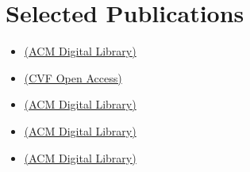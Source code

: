 \documentclass[11pt,a4paper,unicode]{moderncv}
\begin{document}
\section{Selected Publications}
\begin{itemize}[leftmargin=1cm,itemsep=0.3ex]
    \small
    \item {}
        \href{https://dl.acm.org/doi/10.1145/3528223.3530120}{(ACM Digital Library)}
    \item {}
    \href{https://openaccess.thecvf.com/content/CVPR2022/papers/Palmer_DeepCurrents_Learning_Implicit_Representations_of_Shapes_With_Boundaries_CVPR_2022_paper.pdf}{(CVF Open Access)}
    \item {}
        \href{https://dl.acm.org/doi/10.1145/3450626.3459781}{(ACM Digital Library)}
    \item {}
    \href{https://dl.acm.org/doi/10.1145/3355089.3356537}{(ACM Digital Library)}
    \item {}
    \href{https://dl.acm.org/doi/10.1145/3340259}{(ACM Digital Library)}
\end{itemize}
\end{document}
